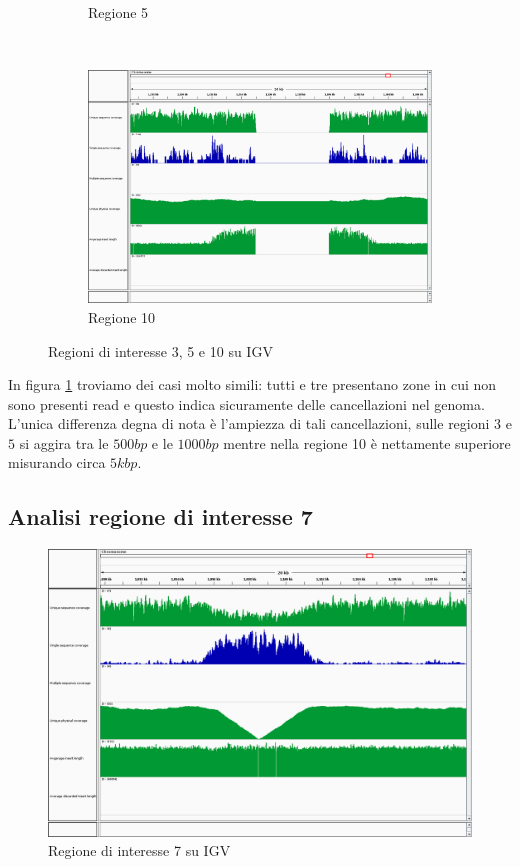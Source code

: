 \begin{figure}[htbp]
\begin{subfigure}[b]{.45\textwidth}
		\caption{Regione 5}
	\end{subfigure}
	\\[1em]
	\begin{subfigure}[b]{.45\textwidth}
		\includegraphics[width=\textwidth]{immagini/igv_regione10.png}
		\caption{Regione 10}
	\end{subfigure}
\caption{Regioni di interesse 3, 5 e 10 su IGV}
\label{fig:regioni 3, 5 e 10}
\end{figure}

In figura \ref{fig:regioni 3, 5 e 10} troviamo dei casi molto simili: tutti e tre presentano zone in cui non sono presenti read e questo indica sicuramente delle cancellazioni nel genoma.
L'unica differenza degna di nota è l'ampiezza di tali cancellazioni, sulle regioni $3$ e $5$ si aggira tra le $500bp$ e le $1000bp$ mentre nella regione 10 è nettamente superiore misurando circa $5kbp$.

\subsection{Analisi regione di interesse 7}
\begin{figure}[htbp]
	\centering
	\includegraphics[width=.45\textwidth]{immagini/igv_regione7.png}
	\caption{Regione di interesse 7 su IGV}
	\label{fig:regione 7}
\end{figure}

